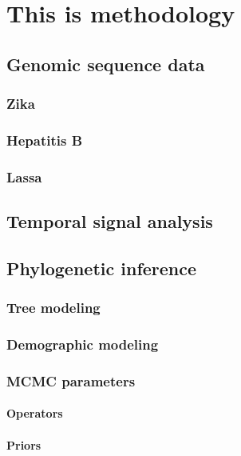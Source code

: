 \chapter{This is methodology}\label{ch:methodology}

\section{Genomic sequence data}

\subsection{Zika}

\subsection{Hepatitis B}

\subsection{Lassa}

\section{Temporal signal analysis}

\section{Phylogenetic inference}

\subsection{Tree modeling}

\subsection{Demographic modeling}

\subsection{MCMC parameters}

\subsubsection{Operators}

\subsubsection{Priors}

